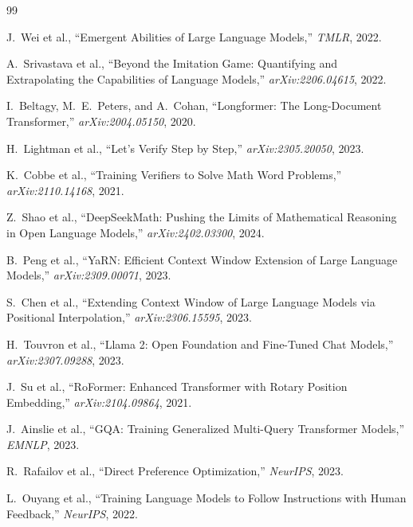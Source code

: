 \documentclass[11pt,a4paper]{article}
\begin{document}
\begin{thebibliography}{99}

J.~Wei et al., ``Emergent Abilities of Large Language Models,'' \textit{TMLR}, 2022.

A.~Srivastava et al., ``Beyond the Imitation Game: Quantifying and Extrapolating the Capabilities
of Language Models,'' \textit{arXiv:2206.04615}, 2022.

I.~Beltagy, M.~E.~Peters, and A.~Cohan, ``Longformer: The Long-Document Transformer,''
\textit{arXiv:2004.05150}, 2020.

H.~Lightman et al., ``Let's Verify Step by Step,'' \textit{arXiv:2305.20050}, 2023.

K.~Cobbe et al., ``Training Verifiers to Solve Math Word Problems,'' \textit{arXiv:2110.14168}, 2021.

Z.~Shao et al., ``DeepSeekMath: Pushing the Limits of Mathematical Reasoning in Open Language
Models,'' \textit{arXiv:2402.03300}, 2024.

B.~Peng et al., ``YaRN: Efficient Context Window Extension of Large Language Models,''
\textit{arXiv:2309.00071}, 2023.

S.~Chen et al., ``Extending Context Window of Large Language Models via Positional Interpolation,''
\textit{arXiv:2306.15595}, 2023.

H.~Touvron et al., ``Llama 2: Open Foundation and Fine-Tuned Chat Models,''
\textit{arXiv:2307.09288}, 2023.

J.~Su et al., ``RoFormer: Enhanced Transformer with Rotary Position Embedding,''
\textit{arXiv:2104.09864}, 2021.

J.~Ainslie et al., ``GQA: Training Generalized Multi-Query Transformer Models,''
\textit{EMNLP}, 2023.

R.~Rafailov et al., ``Direct Preference Optimization,'' \textit{NeurIPS}, 2023.

L.~Ouyang et al., ``Training Language Models to Follow Instructions with Human Feedback,''
\textit{NeurIPS}, 2022.

\end{thebibliography}
\end{document}
